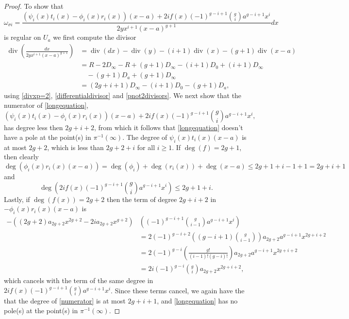 \documentclass[draft, 11pt]{article} %
\theoremstyle{plain}
\theoremstyle{remark}
\DeclareMathOperator{\di}{div}
\begin{document}
\begin{proof}
To show that
\begin{equation}\label{longequation}
\omega_{\sigma i} =  \frac{(\psi_i(x)t_i(x) - \phi_i(x)r_i(x))(x-a) + 2if(x)(-1)^{g-i+1}\binom{g}{i} a^{g-i+1}x^i}{2yx^{i+1}(x-a)^{g+1}}dx
\end{equation}
is regular on $U_a$ we first compute the divisor
\begin{align*}
\di\left( \frac{dx}{2yx^{i+1}(x-a)^{g+1}}\right) & = \di(dx) - \di(y) - (i+1)\di(x) - (g+1)\di(x-a) \\
& = R - 2D_\infty - R + (g+1)D_\infty - (i+1)D_0 + (i+1)D_\infty \\
& \quad - (g+1)D_a + (g+1)D_\infty \\
& = (2g+i+1)D_\infty -(i+1)D_0 - (g+1)D_a,
\end{align*}
using \eqref{divxp=2}, \eqref{differentialdivisor} and \eqref{pnot2divisors}.
We next show that the numerator of \eqref{longequation},
\begin{equation}\label{numerator}
{(\psi_i(x)t_i(x) - \phi_i(x)r_i(x))(x-a) + 2if(x)(-1)^{g-i+1}\binom{g}{i} a^{g-i+1}x^i},
\end{equation}
has degree less then $2g+i+2$, from which it follows that \eqref{longequation} doesn't have a pole at the point(s) in $\pi^{-1}(\infty)$.
The degree of $\psi_i(x)t_i(x)(x-a)$ is at most $2g+2$, which is less than $2g+2+i$ for all $i \geq 1$.
If $\deg(f) = 2g+1$, then clearly
\[
\deg\left( \phi_i(x)r_i(x)(x-a) \right) = \deg(\phi_i) + \deg(r_i(x)) + \deg(x-a) \leq 2g+1 + i-1 +1 = 2g+i+1
\]
and
\[
\deg \left( 2if(x)(-1)^{g-i+1}\binom{g}{i} a^{g-i+1}x^i \right)  \leq  2g+1+i .
\]
Lastly, if $\deg(f(x)) = 2g+2$ then the term of degree $2g+i+2$ in $-\phi_i(x)r_i(x)(x-a)$ is
\begin{align*}
-((2g+2)a_{2g+2}x^{2g+2}-2ia_{2g+2}x^{g+2})&\left( (-1)^{g-i+1}\binom{g}{i-1}a^{g-i+1}x^i\right) \\
&  = 2(-1)^{g-i+2}\left( (g-i+1)\binom{g}{i-1} \right) a_{2g+2}a^{g-i+1}x^{2g+i+2} \\
& = 2(-1)^{g-i} \left( \frac{g!}{(i-1)!(g-i)!} \right) a_{2g+2}a^{g-i+1}x^{2g+i+2} \\
& = 2i(-1)^{g-i}\binom{g}{i}a_{2g+2}x^{2g+i+2},
\end{align*}
which cancels with the term of the same degree in $2if(x)(-1)^{g-i+1}\binom{g}{i}a^{g-i+1}x^i$.
Since these terms cancel, we again have the that the degree of \eqref{numerator} is at most $2g+i+1$, and \eqref{longequation} has no pole(s) at the point(s) in $\pi^{-1}(\infty)$.


\end{proof}
\end{document}
